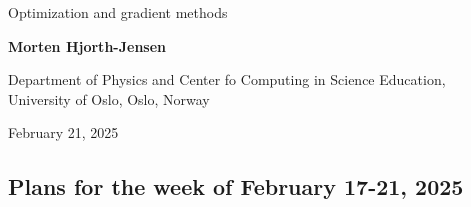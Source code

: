 \documentclass[%
oneside,                 %
final,                   %
10pt]{article}
\begin{document}

\newcommand{\exercisesection}[1]{\subsection*{#1}}






\thispagestyle{empty}

\begin{center}
{\LARGE\bf
\begin{spacing}{1.25}
Optimization and gradient methods
\end{spacing}
}
\end{center}


\begin{center}
{\bf Morten Hjorth-Jensen}
\end{center}

    \begin{center}
\centerline{{\small Department of Physics and Center fo Computing in Science Education, University of Oslo, Oslo, Norway}}
\end{center}
    

\begin{center}
February 21, 2025
\end{center}

\vspace{1cm}



\subsection{Plans for the week of February 17-21, 2025}

\end{document}
